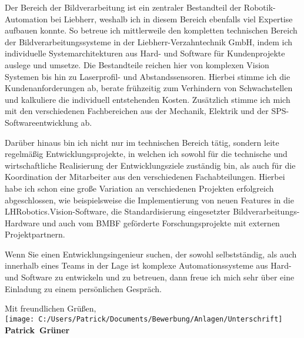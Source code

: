 \documentclass[10pt,a4paper]{article}
\def\firstname{Patrick}
\def\familyname{Grüner}
\begin{document}
Der Bereich der Bildverarbeitung ist ein zentraler Bestandteil der Robotik-Automation bei Liebherr, weshalb ich in diesem Bereich ebenfalls viel Expertise aufbauen konnte. So betreue ich mittlerweile den kompletten technischen Bereich der Bildverarbeitungssysteme in der Liebherr-Verzahntechnik GmbH, indem ich individuelle Systemarchitekturen aus Hard- und Software für Kundenprojekte auslege und umsetze. Die Bestandteile reichen hier von komplexen Vision Systemen bis hin zu Laserprofil- und Abstandssensoren. Hierbei stimme ich die Kundenanforderungen ab, berate frühzeitig zum Verhindern von Schwachstellen und kalkuliere die individuell entstehenden Kosten. Zusätzlich stimme ich mich mit den verschiedenen Fachbereichen aus der Mechanik, Elektrik und der SPS-Softwareentwicklung ab. 

Darüber hinaus bin ich nicht nur im technischen Bereich tätig, sondern leite regelmäßig Entwicklungsprojekte, in welchen ich sowohl für die technische und wirtschaftliche Realisierung der Entwicklungsziele zuständig bin, als auch für die Koordination der Mitarbeiter aus den verschiedenen Fachabteilungen. Hierbei habe ich schon eine große Variation an verschiedenen Projekten erfolgreich abgeschlossen, wie beispielsweise die Implementierung von neuen Features in die LHRobotics.Vision-Software, die Standardisierung eingesetzter Bildverarbeitungs-Hardware und auch vom BMBF geförderte Forschungsprojekte mit externen Projektpartnern.  

Wenn Sie einen Entwicklungsingenieur suchen, der sowohl selbstständig, als auch innerhalb eines Teams in der Lage ist komplexe Automationssysteme aus Hard- und Software zu entwickeln und zu betreuen, dann freue ich mich sehr über eine Einladung zu einem persönlichen Gespräch.


Mit freundlichen Grüßen,\\[3em]

\texttt{[image: C:/Users/Patrick/Documents/Bewerbung/Anlagen/Unterschrift]}\\
{\bfseries \firstname~\familyname}\\
%
\vfill%
\end{document}
